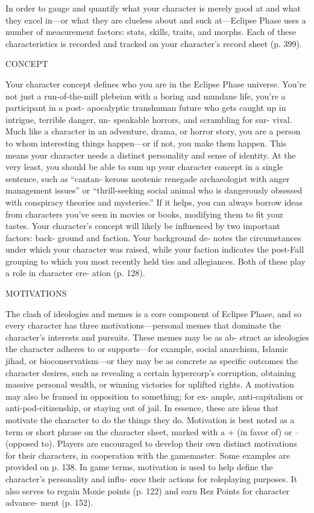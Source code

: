 In order to gauge and quantify what your
character is merely good at and what they
excel in—or what they are clueless about
and suck at—Eclipse Phase uses a number
of measurement factors: stats, skills, traits,
and morphs. Each of these characteristics
is recorded and tracked on your character's
record sheet (p. 399).

CONCEPT

Your character concept defines who you are
in the Eclipse Phase universe. You're not just
a run-of-the-mill plebeian with a boring and
mundane life, you're a participant in a post-
apocalyptic transhuman future who gets
caught up in intrigue, terrible danger, un-
speakable horrors, and scrambling for sur-
vival. Much like a character in an adventure,
drama, or horror story, you are a person
to whom interesting things happen—or if
not, you make them happen. This means
your character needs a distinct personality
and sense of identity. At the very least, you
should be able to sum up your character
concept in a single sentence, such as “cantan-
kerous neotenic renegade archaeologist with
anger management issues” or “thrill-seeking
social animal who is dangerously obsessed
with conspiracy theories and mysteries.” If
it helps, you can always borrow ideas from
characters you've seen in movies or books,
modifying them to fit your tastes.
   Your character's concept will likely be
influenced by two important factors: back-
ground and faction. Your background de-
  notes the circumstances under which your
character was raised, while your faction
indicates the post-Fall grouping to which
you most recently held ties and allegiances.
Both of these play a role in character cre-
ation (p. 128).

MOTIVATIONS

The clash of ideologies and memes is a core
component of Eclipse Phase, and so every
character has three motivations—personal
memes that dominate the character's interests
and pursuits. These memes may be as ab-
stract as ideologies the character adheres to
or supports—for example, social anarchism,
Islamic jihad, or bioconservatism—or they
may be as concrete as specific outcomes the
  character desires, such as revealing a certain
hypercorp's corruption, obtaining massive
personal wealth, or winning victories for
  uplifted rights. A motivation may also be
framed in opposition to something; for ex-
ample, anti-capitalism or anti-pod-citizenship,
or staying out of jail. In essence, these are
ideas that motivate the character to do the
things they do. Motivation is best noted as a
term or short phrase on the character sheet,
marked with a + (in favor of) or – (opposed
to). Players are encouraged to develop their
own distinct motivations for their characters,
in cooperation with the gamemaster. Some
examples are provided on p. 138.
   In game terms, motivation is used to help
define the character's personality and influ-
ence their actions for roleplaying purposes.
It also serves to regain Moxie points (p. 122)
and earn Rez Points for character advance-
ment (p. 152).


